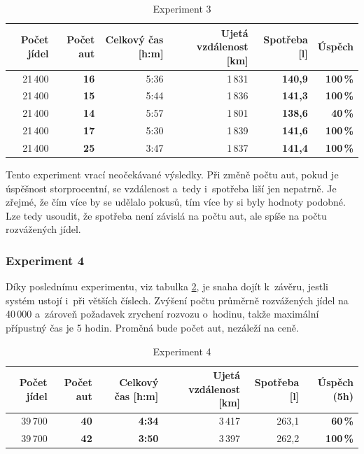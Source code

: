 \documentclass[a4paper, 11pt]{article}
\begin{document}
	\begin{table}[ht]
		\centering
		\begin{tabular}{|r|r|r|r|r|r|}
			\hline
			Počet jídel & \textbf{Počet aut} & Celkový čas [h:m]
				& Ujetá vzdálenost [km] & \textbf{Spotřeba [l]}
				& \textbf{Úspěch} \\ \hline

			21\,400 & \textbf{16} & 5:36 & 1\,831 & \textbf{140,9}
				& \textbf{100\,\%} \\ \hline

			21\,400 & \textbf{15} & 5:44 & 1\,836 & \textbf{141,3}
				& \textbf{100\,\%} \\ \hline

			21\,400 & \textbf{14} & 5:57 & 1\,801 & \textbf{138,6}
				& \textbf{40\,\%}  \\ \hline

			21\,400 & \textbf{17} & 5:30 & 1\,839 & \textbf{141,6}
				& \textbf{100\,\%} \\ \hline

			21\,400 & \textbf{25} & 3:47 & 1\,837 & \textbf{141,4}
				& \textbf{100\,\%} \\ \hline
		\end{tabular}

		\caption{Experiment 3}
		\label{table:experiment3}
	\end{table}

	Tento experiment vrací neočekávané výsledky. Při změně počtu aut, pokud je
	úspěšnost storprocentní, se vzdálenost a~tedy i~spotřeba liší jen nepatrně.
	Je zřejmé, že čím více by se udělalo pokusů, tím více by si byly hodnoty
	podobné. Lze tedy usoudit, že spotřeba není závislá na počtu aut, ale
	spíše na počtu rozvážených jídel.

	\subsubsection{Experiment 4}
	\label{section:experiment4}

	Díky poslednímu experimentu, viz tabulka \ref{table:experiment4}, je snaha
	dojít k~závěru, jestli systém ustojí i~při větších číslech. Zvýšení počtu
	průměrně rozvážených jídel na 40\,000 a~zároveň požadavek zrychení
	rozvozu o~hodinu, takže maximální přípustný čas je 5 hodin. Proměná bude
	počet aut, nezáleží na ceně.

	\begin{table}[ht]
		\centering
		\begin{tabular}{|r|r|r|r|r|r|}
			\hline
			Počet jídel & \textbf{Počet aut} & \textbf{Celkový čas [h:m]}
				& Ujetá vzdálenost [km] & Spotřeba [l]
				& \textbf{Úspěch (5h)} \\ \hline

			39\,700 & \textbf{40} & \textbf{4:34} & 3\,417 & 263,1
				& \textbf{60\,\%} \\ \hline

			39\,700 & \textbf{42} & \textbf{3:50} & 3\,397 & 262,2
				& \textbf{100\,\%} \\ \hline
		\end{tabular}

		\caption{Experiment 4}
		\label{table:experiment4}
	\end{table}
\end{document}
